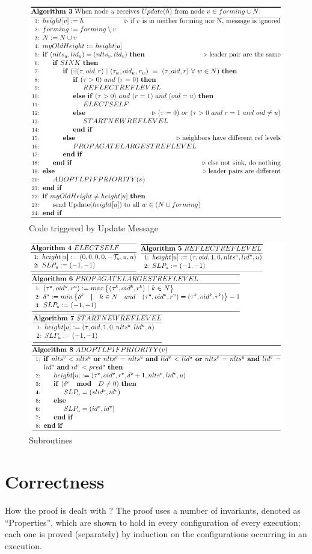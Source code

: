 \documentclass{beamer}
\begin{document}
\begin{frame}
\begin{figure}[h]
	\centering
	\includegraphics[width=0.7\linewidth]{message_received.png}
	\caption{Code triggered by Update Message}
	\label{fig:figure1}
\end{figure}
\end{frame}

\begin{frame}
\begin{figure}[h]
	\centering
	\includegraphics[width=0.75\linewidth]{subroutines.png}
	\caption{Subroutines}
	\label{fig:figure1}
\end{figure}
\end{frame}


\section{Correctness}
\begin{frame}{How the proof is dealt with ?}
	The proof uses a number of invariants, denoted as “Properties”, which are shown to hold in every configuration of every execution; each one is proved (separately) by induction on the configurations occurring in an execution.
\end{frame}
\end{document}
